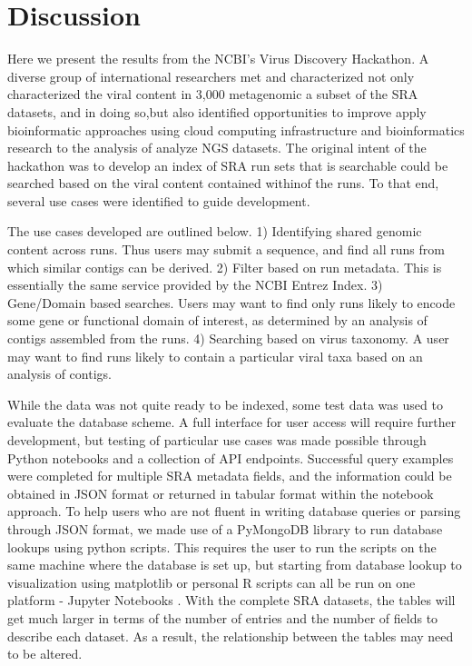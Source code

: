 \documentclass[genes, moreauthors]{Definitions/mdpi}
\begin{document}
\section{Discussion}

Here we present the results from the NCBI's Virus Discovery Hackathon. A
diverse group of international researchers met and  characterized not only
characterized the viral content in 3,000 metagenomic a subset of the SRA
datasets, and in doing so,but also identified opportunities to improve apply
bioinformatic approaches using cloud computing infrastructure and
bioinformatics research to the analysis of analyze NGS datasets. The original
intent of the hackathon was to develop an index of SRA run sets that is
searchable could be searched based on the viral content contained withinof the
runs. To that end, several use cases were identified to guide development.

The use cases developed are outlined below. 1) Identifying shared genomic
content across runs. Thus users may submit a sequence, and find all runs from
which similar contigs can be derived. 2) Filter based on run metadata. This is
essentially the same service provided by the NCBI Entrez Index. 3) Gene/Domain
based searches. Users may want to find only runs likely to encode some gene or
functional domain of interest, as determined by an analysis of contigs
assembled from the runs. 4) Searching based on virus taxonomy. A user may want
to find runs likely to contain a particular viral taxa based on an analysis of
contigs.


While the data was not quite ready to be indexed, some test data was used to
evaluate the database scheme. A full interface for user access will require
further development, but testing of particular use cases was made possible
through Python notebooks \cite{jupyterNotebook} and a collection of API
endpoints. Successful query examples were completed for multiple SRA metadata fields, and the information
could be obtained in JSON \cite{rfc_json} format or returned in tabular format
within the notebook approach. To help users who are not fluent in writing database queries
or parsing through JSON format, we made use of a PyMongoDB library to run
database lookups using python scripts. This requires the user to run the
scripts on the same machine where the database is set up, but starting from
database lookup to visualization using matplotlib or personal R scripts can all
be run on one platform - Jupyter Notebooks \cite{jupyterNotebook}. With the
complete SRA datasets, the tables will get much larger in terms of the number
of entries and the number of fields to describe each dataset. As a result, the
relationship between the tables may need to be altered.
\end{document}
